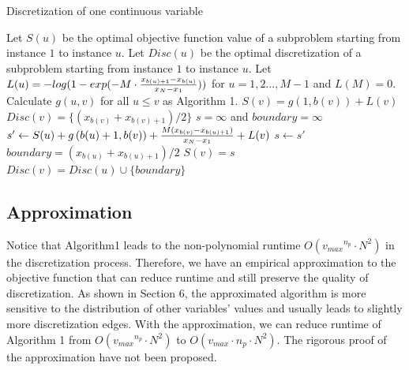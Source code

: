 \begin{algorithm}
\caption{ Discretization of one continuous variable}\label{euclid}
\begin{algorithmic}[1]
\State Let $S(u)$ be the optimal objective function value of a subproblem starting from instance $1$ to instance $u$.
\State Let $Disc(u)$ be the optimal discretization of a subproblem starting from instance $1$ to instance $u$.
\State Let $L(u) = - log(1 - {exp(- M \cdot {{x_{b(u)+1} - x_{b(u)}}\over{x_N - x_1}})})$ for $u = 1,2...,M-1$ and $L(M) = 0$. 
\State Calculate $g(u,v)$ for all $u \leq v$ as Algorithm 1.
\State $S(v) = g \left(1,b(v) \right) + L(v)$
\State $Disc(v) = \{ ({x_{b(v)} + x_{b(v)+1}}) / 2\}$
\Else
\State $s = \infty$ and $boundary = \infty$
\State $s' \leftarrow S(u) + g \left( b(u)+1,b(v) \right) +  {M({x_{b(v)} - x_{b(u) + 1}})\over{x_N - x_1}} + L(v)$
\State $s \leftarrow s'$
\State $boundary = ({x_{b(u)} + x_{b(u)+1}}) / 2$
\EndIf
\EndFor
\State $S(v) = s$
\State $Disc(v) = Disc(u) \cup \{ boundary\}$
\EndIf
\EndFor

\end{algorithmic}
\end{algorithm}

\subsection{Approximation}
\label{approx}
Notice that Algorithm1 leads to the non-polynomial runtime $O({v_{max}}^{n_p} \cdot N^2)$ in the discretization process. Therefore, we have an empirical approximation to the objective function that can reduce runtime and still preserve the quality of discretization. As shown in Section 6, the approximated algorithm is more sensitive to the distribution of other variables' values and usually leads to slightly more discretization edges. With the approximation, we can reduce runtime of Algorithm 1 from $O({v_{max}}^{n_p} \cdot N^2)$ to $O({v_{max}} \cdot {n_p} \cdot N^2)$. The rigorous proof of the approximation have not been proposed.

